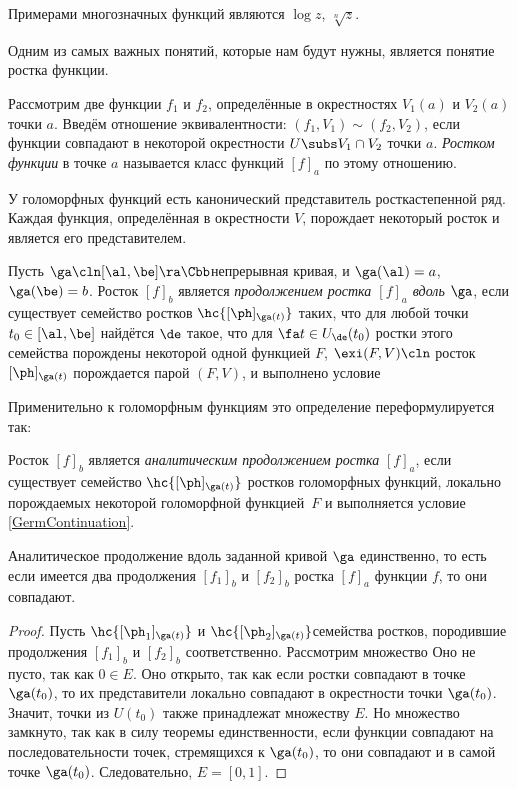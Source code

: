\documentclass[a4paper]{article}
\begin{document}
Примерами многозначных функций являются $\log z$, $\sqrt[n]{z}$.

Одним из самых важных понятий, которые нам будут нужны, является понятие ростка функции.

\begin{df}
Рассмотрим две функции $f_1$ и $f_2$, определённые в окрестностях $V_1(a)$ и $V_2(a)$ точки $a$. Введём отношение
эквивалентности: $(f_1, V_1) \sim (f_2, V_2)$, если функции совпадают в некоторой окрестности $U \subs V_1 \cap V_2$
точки $a$. \emph{Ростком функции} в точке $a$ называется класс функций $[f]_a$ по этому отношению.
\end{df}

У голоморфных функций есть канонический представитель ростка\т степенной ряд.
Каждая функция, определённая в окрестности $V$, порождает некоторый росток и является его представителем.

\begin{df}
Пусть $\ga\cln[\al,\be]\ra\Cbb$\т непрерывная кривая, и $\ga(\al)=a$, $\ga(\be)=b$.
Росток $[f]_b$ является \emph{продолжением ростка $[f]_a$ вдоль $\ga$}, если существует семейство ростков
$\hc{[\ph]_{\ga(t)}}$ таких, что для любой точки $t_0\in[\al,\be]$ найдётся $\de$ такое, что для $\fa t \in U_\de(t_0)$
ростки этого семейства порождены некоторой одной функцией $F$,  $\exi (F,V)\cln$ росток $[\ph]_{\ga(t)}$ порождается
парой $(F, V)$, и выполнено условие
\end{df}

Применительно к голоморфным функциям это определение переформулируется так:

\begin{df}
Росток $[f]_b$ является \emph{аналитическим продолжением ростка} $[f]_a$, если существует семейство
$\hc{[\ph]_{\ga(t)}}$ ростков голоморфных функций, локально порождаемых некоторой голоморфной функцией~$F$
и выполняется условие \eqref{GermContinuation}.
\end{df}

\begin{stm}
Аналитическое продолжение вдоль заданной кривой $\ga$ единственно, то есть если имеется два продолжения $[f_1]_b$ и $[f_2]_b$
ростка $[f]_a$ функции $f$, то они совпадают.
\end{stm}
\begin{proof}
Пусть $\hc{[\ph_1]_{\ga(t)}}$ и $\hc{[\ph_2]_{\ga(t)}}$\т семейства ростков, породившие продолжения $[f_1]_b$ и $[f_2]_b$
соответственно. Рассмотрим множество
Оно не пусто, так как $0\in E$. Оно открыто, так как если ростки совпадают в точке $\ga(t_0)$, то их представители локально совпадают в окрестности
точки $\ga(t_0)$. Значит, точки из $U(t_0)$ также принадлежат множеству $E$. Но множество замкнуто, так как в силу теоремы
единственности, если функции совпадают на последовательности точек, стремящихся к $\ga(t_0)$, то они совпадают и в самой точке
$\ga(t_0)$. Следовательно, $E=[0,1]$.
\end{proof}
\end{document}
